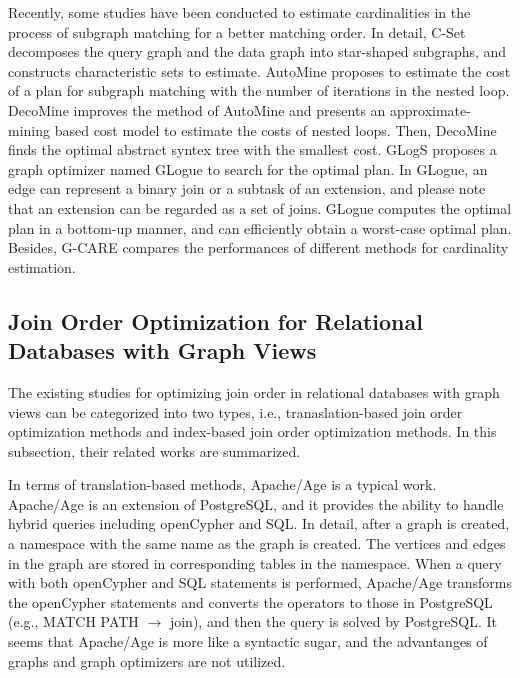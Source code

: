 Recently, some studies have been conducted to estimate cardinalities in the process of subgraph matching for a better matching order.
In detail, 
C-Set \cite{cset} decomposes the query graph and the data graph into star-shaped subgraphs, and constructs characteristic sets to estimate.
AutoMine \cite{AutoMine} proposes to estimate the cost of a plan for subgraph matching with the number of iterations in the nested loop.
DecoMine \cite{DecoMine} improves the method of AutoMine and presents an approximate-mining based cost model to estimate the costs of nested loops.
Then, DecoMine finds the optimal abstract syntex tree with the smallest cost.
GLogS \cite{GLogS} proposes a graph optimizer named GLogue to search for the optimal plan.
In GLogue, an edge can represent a binary join or a subtask of an extension, and please note that an extension can be regarded as a set of joins.
GLogue computes the optimal plan in a bottom-up manner, and can efficiently obtain a worst-case optimal plan.
Besides, G-CARE \cite{gcare} compares the performances of different methods for cardinality estimation.



\subsection{Join Order Optimization for Relational Databases with Graph Views}
\label{sec:related-work:ropt-gopt}
The existing studies for optimizing join order in relational databases with graph views can be categorized into two types, i.e., tranaslation-based join order optimization methods and index-based join order optimization methods.
In this subsection, their related works are summarized. 


In terms of translation-based methods, Apache/Age \cite{apache-age} is a typical work.
Apache/Age is an extension of PostgreSQL, and it provides the ability to handle hybrid queries including openCypher and SQL.
In detail, after a graph is created, a namespace with the same name as the graph is created.
The vertices and edges in the graph are stored in corresponding tables in the namespace.
When a query with both openCypher and SQL statements is performed, Apache/Age transforms the openCypher statements and converts the operators to those in PostgreSQL (e.g., MATCH PATH $\rightarrow$ join), and then the query is solved by PostgreSQL.
It seems that Apache/Age is more like a syntactic sugar, and the advantanges of graphs and graph optimizers are not utilized.


